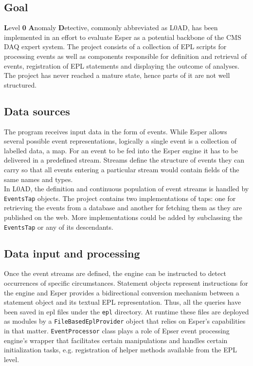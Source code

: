 \subsection {Goal}
\textbf{L}evel \textbf{0} \textbf{A}nomaly \textbf{D}etective, commonly abbreviated as L0AD, has been implemented in an effort to evaluate Esper as a potential backbone of the CMS DAQ expert system. The project consists of a collection of EPL scripts for processing events as well as components responsible for definition and retrieval of events, registration of EPL statements and displaying the outcome of analyses.
The project has never reached a mature state, hence parts of it are not well structured.

\subsection{Data sources}
The program receives input data in the form of events. While Esper allows several possible event representations, logically a single event is a collection of labelled data, a map. For an event to be fed into the Esper engine it has to be delivered in a predefined stream. Streams define the structure of events they can carry so that all events entering a particular stream would contain fields of the same names and types. \\

In L0AD, the definition and continuous population of event streams is handled by \texttt{EventsTap} objects. The project contains two implementations of taps: one for retrieving the events from a database and another for fetching them as they are published on the web. More implementations could be added by subclassing the \texttt{EventsTap} or any of its descendants.

\subsection{Data input and processing}

Once the event streams are defined, the engine can be instructed to detect occurrences of specific circumstances. Statement objects represent instructions for the engine and Esper provides a bidirectional conversion mechanism between a statement object and its textual EPL representation. Thus, all the queries have been saved in epl files under the \texttt{epl} directory. At runtime these files are deployed as modules by a \texttt{FileBasedEplProvider} object that relies on Esper's capabilities in that matter. \texttt{EventProcessor} class plays a role of Epser event processing engine's wrapper that facilitates certain manipulations and handles certain initialization tasks, e.g. registration of helper methods available from the EPL level.

